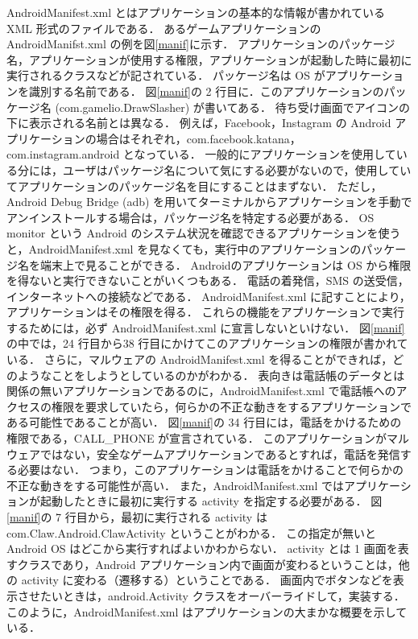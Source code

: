 AndroidManifest.xml とはアプリケーションの基本的な情報が書かれている XML 形式のファイルである．
あるゲームアプリケーションの AndroidManifst.xml の例を図\ref{manif}に示す．
アプリケーションのパッケージ名，アプリケーションが使用する権限，アプリケーションが起動した時に最初に実行されるクラスなどが記されている．
パッケージ名は OS がアプリケーションを識別する名前である．
図\ref{manif}の 2 行目に．このアプリケーションのパッケージ名 (com.gamelio.DrawSlasher) が書いてある．
待ち受け画面でアイコンの下に表示される名前とは異なる．
例えば，Facebook，Instagram の Android アプリケーションの場合はそれぞれ，com.facebook.katana，com.instagram.android となっている．
一般的にアプリケーションを使用している分には，ユーザはパッケージ名について気にする必要がないので，使用していてアプリケーションのパッケージ名を目にすることはまずない．
ただし，Android Debug Bridge (adb) を用いてターミナルからアプリケーションを手動でアンインストールする場合は，パッケージ名を特定する必要がある．
OS monitor という Android のシステム状況を確認できるアプリケーションを使うと，AndroidManifest.xml を見なくても，実行中のアプリケーションのパッケージ名を端末上で見ることができる．
Androidのアプリケーションは OS から権限を得ないと実行できないことがいくつもある．
電話の着発信，SMS の送受信， インターネットへの接続などである．
AndroidManifest.xml に記すことにより，アプリケーションはその権限を得る．
これらの機能をアプリケーションで実行するためには，必ず AndroidManifest.xml に宣言しないといけない．
図\ref{manif}の中では，24 行目から38 行目にかけてこのアプリケーションの権限が書かれている．
さらに，マルウェアの AndroidManifest.xml を得ることができれば，どのようなことをしようとしているのかがわかる．
表向きは電話帳のデータとは関係の無いアプリケーションであるのに，AndroidManifest.xml で電話帳へのアクセスの権限を要求していたら，何らかの不正な動きをするアプリケーションである可能性であることが高い．
 図\ref{manif}の 34 行目には，電話をかけるための権限である，CALL\_PHONE が宣言されている．
 このアプリケーションがマルウェアではない，安全なゲームアプリケーションであるとすれば，電話を発信する必要はない．
 つまり，このアプリケーションは電話をかけることで何らかの不正な動きをする可能性が高い．
 また，AndroidManifest.xml ではアプリケーションが起動したときに最初に実行する activity を指定する必要がある．
 図\ref{manif}の 7 行目から，最初に実行される activity は com.Claw.Android.ClawActivity ということがわかる．
 この指定が無いと Android OS はどこから実行すればよいかわからない．
activity とは 1 画面を表すクラスであり，Android アプリケーション内で画面が変わるということは，他の activity に変わる（遷移する）ということである．
 画面内でボタンなどを表示させたいときは，android.Activity クラスをオーバーライドして，実装する．
 このように，AndroidManifest.xml はアプリケーションの大まかな概要を示している．

